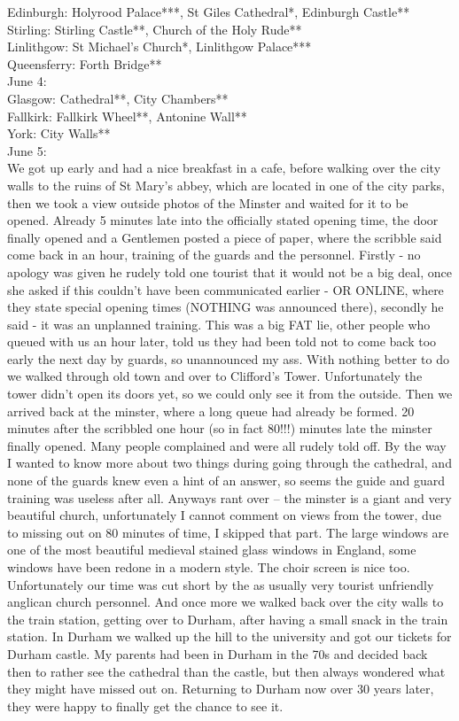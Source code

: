 Edinburgh: Holyrood Palace***, St Giles Cathedral*, Edinburgh Castle**\\
Stirling: Stirling Castle**, Church of the Holy Rude**\\
Linlithgow: St Michael's Church*, Linlithgow Palace***\\
Queensferry: Forth Bridge**\\

June 4:\\
Glasgow: Cathedral**, City Chambers**\\
Fallkirk: Fallkirk Wheel**, Antonine Wall**\\
York: City Walls**\\

June 5:\\
We got up early and had a nice breakfast in a cafe, before walking over the city walls to the ruins of St Mary's abbey, which are located in one of the city parks, then we took a view outside photos of the Minster and waited for it to be opened. Already 5 minutes late into the officially stated opening time, the door finally opened and a Gentlemen posted a piece of paper, where the scribble said come back in an hour, training of the guards and the personnel. Firstly - no apology was given he rudely told one tourist that it would not be a big deal, once she asked if this couldn't have been communicated earlier - OR ONLINE, where they state special opening times (NOTHING was announced there), secondly he said - it was an unplanned training. This was a big FAT lie, other people who queued with us an hour later, told us they had been told not to come back too early the next day by guards, so unannounced my ass. With nothing better to do we walked through old town and over to Clifford's Tower. Unfortunately the tower didn't open its doors yet, so we could only see it from the outside. Then we arrived back at the minster, where a long queue had already be formed. 20 minutes after the scribbled one hour (so in fact 80!!!) minutes late the minster finally opened. Many people complained and were all rudely told off. By the way I wanted to know more about two things during going through the cathedral, and none of the guards knew even a hint of an answer, so seems the guide and guard training was useless after all. Anyways rant over -- the minster is a giant and very beautiful church, unfortunately I cannot comment on views from the tower, due to missing out on 80 minutes of time, I skipped that part. The large windows are one of the most beautiful medieval stained glass windows in England, some windows have been redone in a modern style. The choir screen is nice too. Unfortunately our time was cut short by the as usually very tourist unfriendly anglican church personnel. And once more we walked back over the city walls to the train station, getting over to Durham, after having a small snack in the train station. In Durham we walked up the hill to the university and got our tickets for Durham castle. My parents had been in Durham in the 70s and decided back then to rather see the cathedral than the castle, but then always wondered what they might have missed out on. Returning to Durham now over 30 years later, they were happy to finally get the chance to see it.\\

